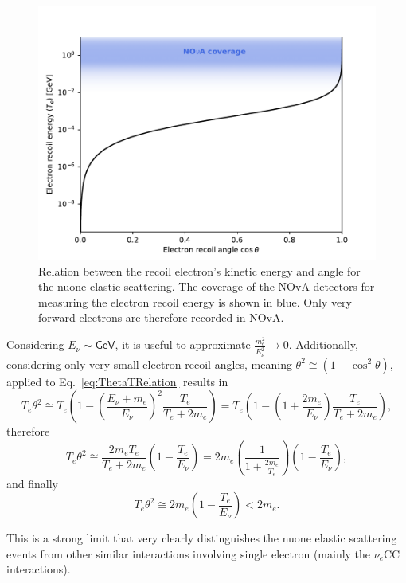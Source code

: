 \begin{figure}[hbtp]
\centering
\includegraphics[width=.7\linewidth]{Plots/NuMM/KinematicsTOnTh.pdf}
\caption[Electron recoil energy versus recoil angle]{Relation between the recoil electron's kinetic energy and angle for the \acrshort{nuone} elastic scattering. The coverage of the \acrshort{NOvA} detectors for measuring the electron recoil energy is shown in blue. Only very forward electrons are therefore recorded in \acrshort{NOvA}.}
\label{fig:TThetaDistribution}
\end{figure}

Considering $E_{\nu}\sim\textsf{GeV}$, it is useful to approximate $\frac{m_e^2}{E_{\nu}^2}\rightarrow 0$. Additionally, considering only very small electron recoil angles, meaning $\theta^2\cong \left(1-\cos^2\theta\right)$, applied to Eq.~\ref{eq:ThetaTRelation} results in
\begin{equation}
T_e\theta^2\cong T_e\left(1-\left(\frac{E_\nu+m_e}{E_\nu}\right)^2\frac{T_e}{T_e+2m_e}\right)
=T_e\left(1-\left(1+\frac{2m_e}{E_\nu}\right)\frac{T_e}{T_e+2m_e}\right),
\end{equation}
therefore
\begin{equation}
T_e\theta^2\cong \frac{2m_eT_e}{T_e+2m_e}\left(1-\frac{T_e}{E_\nu}\right)=2m_e\left(\frac{1}{1+\frac{2m_e}{T_e}}\right)\left(1-\frac{T_e}{E_\nu}\right),
\end{equation}
and finally
\begin{equation}\label{eqTThetaSqExp}
T_e\theta^2\cong 2m_e\left(1-\frac{T_e}{E_{\nu}}\right)<2m_e.
\end{equation}

This is a strong limit that very clearly distinguishes the \gls{nuone} elastic scattering events from other similar interactions involving single electron (mainly the $\nu_e$\gls{CC} interactions).


